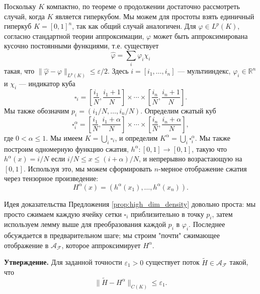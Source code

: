 \documentclass[../NDCNNAI_main.tex]{subfiles}
\begin{document}
Поскольку \( K \) компактно, по теореме о продолжении достаточно рассмотреть случай, когда \( K \) является гиперкубом. Мы можем для простоты взять единичный гиперкуб \( K = [0, 1]^n \), так как общий случай аналогичен. Для \( \varphi \in L^p(K) \), согласно стандартной теории аппроксимации, \( \varphi \) может быть аппроксимирована кусочно постоянными функциями, т.е. существует
\[
\hat{\varphi} = \sum_i \varphi_i \chi_i 
\]
такая, что \(\|\hat{\varphi} - \varphi\|_{L^p(K)} \leq \varepsilon/2\). Здесь \( i = [i_1, \ldots, i_n] \) --- мультииндекс, \( \varphi_i \in \mathbb{R}^n \) и \( \chi_i \) --- индикатор куба
\[
\square_i = \left[ \frac{i_1}{N}, \frac{i_1 + 1}{N} \right] \times \cdots \times \left[ \frac{i_n}{N}, \frac{i_n + 1}{N} \right]. 
\]
Мы также обозначим \( p_i = (i_1/N, \ldots, i_n/N) \). Определим сжатый куб
\[
\square_i^\alpha = \left[ \frac{i_1}{N}, \frac{i_1 + \alpha}{N} \right] \times \cdots \times \left[ \frac{i_n}{N}, \frac{i_n + \alpha}{N} \right], 
\]
где \( 0 < \alpha \leq 1 \). Мы имеем \( K = \bigcup_i \square_i \), и определим \( K^\alpha = \bigcup_i \square_i^\alpha \). Мы также построим одномерную функцию сжатия, \( h^\alpha : [0, 1] \rightarrow [0, 1] \), такую что \( h^\alpha(x) = i/N \) если \( i/N \leq x \leq (i + \alpha)/N \), и непрерывно возрастающую на \([0, 1]\). Используя это, мы можем сформировать \( n \)-мерное отображение сжатия через тензорное произведение:
\[
H^\alpha(x) = (h^\alpha(x_1), \ldots, h^\alpha(x_n)). 
\]

Идея доказательства Предложения \ref{prop:high_dim_density} довольно проста: мы просто сжимаем каждую ячейку сетки \( \square_i \) приблизительно в точку \( p_i \), затем используем лемму выше для преобразования каждой \( p_i \) в \( \varphi_i \). Последнее обсуждается в предварительном шаге; мы строим "почти" сжимающее отображение в \( \mathcal{A}_{\mathcal{F}} \), которое аппроксимирует \( H^\alpha \).

\textbf{Утверждение.} Для заданной точности \( \varepsilon_1 > 0 \) существует поток \( \tilde{H} \in \mathcal{A}_{\mathcal{F}} \) такой, что
\[
\| \tilde{H} - H^\alpha \|_{C(K)} \leq \varepsilon_1.
\]
\end{document}
